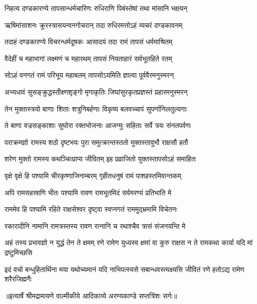 \twolineshloka
{निहत्य दण्डकारण्ये तापसान्धर्मचारिणः}
{रुधिराणि पिबंस्तेषां तथा मांसानि भक्षयन्} %

\twolineshloka
{ऋषिमांसाशनः क्रूरस्त्रासयन्वनगोचरान्}
{तदा रुधिरमत्तोऽहं व्यचरं दण्डकावनम्} %

\twolineshloka
{तदाहं दण्डकारण्ये विचरन्धर्मदूषकः}
{आसादयं तदा रामं तापसं धर्ममाश्रितम्} %

\twolineshloka
{वैदेहीं च महाभागां लक्ष्मणं च महारथम्}
{तापसं नियताहारं सर्वभूतहिते रतम्} %

\twolineshloka
{सोऽहं वनगतं रामं परिभूय महाबलम्}
{तापसोऽयमिति ज्ञात्वा पूर्ववैरमनुस्मरन्} %

\twolineshloka
{अभ्यधावं सुसङ्क्रुद्धस्तीक्ष्णशृङ्गो मृगाकृतिः}
{जिघांसुरकृतप्रज्ञस्तं प्रहारमनुस्मरन्} %

\twolineshloka
{तेन मुक्तास्त्रयो बाणाः शिताः शत्रुनिबर्हणाः}
{विकृष्य बलवच्चापं सुपर्णानिलतुल्यगाः} %

\twolineshloka
{ते बाणा वज्रसङ्काशाः सुघोरा रक्तभोजनाः}
{आजग्मुः सहिताः सर्वे त्रयः संनतपर्वणः} %

\twolineshloka
{पराक्रमज्ञो रामस्य शठो दृष्टभयः पुरा}
{समुत्क्रान्तस्ततो मुक्तस्तावुभौ राक्षसौ हतौ} %

\twolineshloka
{शरेण मुक्तो रामस्य कथञ्चित्प्राप्य जीवितम्}
{इह प्रव्राजितो युक्तस्तापसोऽहं समाहितः} %

\twolineshloka
{वृक्षे वृक्षे हि पश्यामि चीरकृष्णाजिनाम्बरम्}
{गृहीतधनुषं रामं पाशहस्तमिवान्तकम्} %

\twolineshloka
{अपि रामसहस्राणि भीतः पश्यामि रावण}
{रामभूतमिदं सर्वमरण्यं प्रतिभाति मे} %

\twolineshloka
{राममेव हि पश्यामि रहिते राक्षसेश्वर}
{दृष्ट्वा स्वप्नगतं राममुद्भ्रमामि विचेतनः} %

\twolineshloka
{रकारादीनि नामानि रामत्रस्तस्य रावण}
{रत्नानि च रथाश्चैव त्रासं संजनयन्ति मे} %

\threelineshloka
{अहं तस्य प्रभावज्ञो न युद्धं तेन ते क्षमम्}
{रणे रामेण युध्यस्व क्षमां वा कुरु राक्षस}
{न ते रामकथा कार्या यदि मां द्रष्टुमिच्छसि} %

\fourlineindentedshloka
{इदं वचो बन्धुहितार्थिना मया}
{यथोच्यमानं यदि नाभिपत्स्यसे}
{सबान्धवस्त्यक्ष्यसि जीवितं रणे}
{हतोऽद्य रामेण शरैरजिह्मगैः} %


{॥इत्यार्षे श्रीमद्रामायणे वाल्मीकीये आदिकाव्ये अरण्यकाण्डे सप्तत्रिंशः सर्गः॥}

